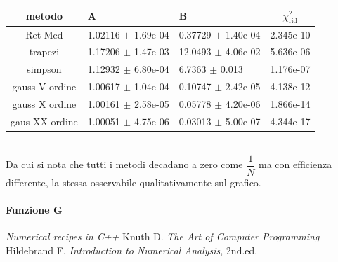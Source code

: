 \documentclass{article}
\begin{document}
\begin{tabular}{|c|l|l|c|}
\hline
metodo & A & B & $\chi^{2}_{\textrm{rid}}$ \\
\hline \hline
Ret Med        & 1.02116 $\pm$ 1.69e-04 & 0.37729 $\pm$ 1.40e-04 & 2.345e-10\\
\hline
trapezi		   & 1.17206 $\pm$ 1.47e-03 & 12.0493 $\pm$ 4.06e-02 & 5.636e-06\\
\hline
simpson        & 1.12932 $\pm$ 6.80e-04 & 6.7363  $\pm$ 0.013 & 1.176e-07\\
\hline
gauss V ordine & 1.00617 $\pm$ 1.04e-04 & 0.10747 $\pm$ 2.42e-05 & 4.138e-12\\
\hline
gauss X ordine & 1.00161 $\pm$ 2.58e-05 & 0.05778 $\pm$ 4.20e-06 & 1.866e-14\\
\hline 
gaus XX ordine & 1.00051 $\pm$ 4.75e-06 & 0.03013 $\pm$ 5.00e-07 & 4.344e-17\\ 
\hline

\end{tabular}
\\

Da cui si nota che tutti i metodi decadano a zero come $\dfrac{1}{N}$ ma con efficienza differente, la stessa osservabile qualitativamente sul grafico.

\paragraph{Funzione G}

\begin{thebibliography}{99}
\emph{Numerical recipes in C++}
Knuth D. \emph{The Art of Computer Programming}
Hildebrand F. \emph{Introduction to Numerical Analysis}, 2nd.ed.
\end{thebibliography}
\end{document}
